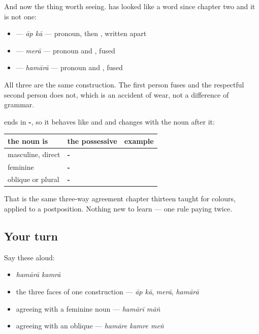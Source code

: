And now the thing worth seeing. \textbf{} has looked like a word since chapter two and it is not one:

\begin{itemize}
\raggedright
  \item \textbf{ } — \emph{āp kā} — pronoun, then \textbf{}, written apart
  \item \textbf{} — \emph{merā} — pronoun and \textbf{}, fused
  \item \textbf{} — \emph{hamārā} — pronoun and \textbf{}, fused
\end{itemize}

All three are the same construction. The first person fuses and the respectful second person does not, which is an accident of wear, not a difference of grammar.

\begin{grammarlens}[title={Grammar Lens: the possessive agrees, like any adjective}]
\textbf{} ends in \textbf{-}, so it behaves like \textbf{} and \textbf{} and changes with the noun after it:

\noindent
\begin{tabularx}{\linewidth}{@{}>{\raggedright\arraybackslash}X>{\raggedright\arraybackslash}X>{\raggedright\arraybackslash}X@{}}
\toprule
\textbf{the noun is} & \textbf{the possessive} & \textbf{example} \\
\midrule
masculine, direct & \textbf{-\ur{ا}} & \textbf{\ur{ہمارا} \ur{کمرہ}} \\
feminine & \textbf{-\ur{ی}} & \textbf{\ur{ہماری} \ur{ماں}} \\
oblique or plural & \textbf{-\ur{ے}} & \textbf{\ur{ہمارے} \ur{کمرے} \ur{میں}} \\
\bottomrule
\end{tabularx}

That is the same three-way agreement chapter thirteen taught for colours, applied to a postposition. Nothing new to learn — one rule paying twice.
\end{grammarlens}

\subsection*{Your turn}
Say these aloud:

\begin{itemize}
\raggedright
  \item \emph{hamārā kamrā}
  \item the three faces of one construction — \emph{āp kā}, \emph{merā}, \emph{hamārā}
  \item agreeing with a feminine noun — \emph{hamārī māṅ}
  \item agreeing with an oblique — \emph{hamāre kamre meṅ}
\end{itemize}

